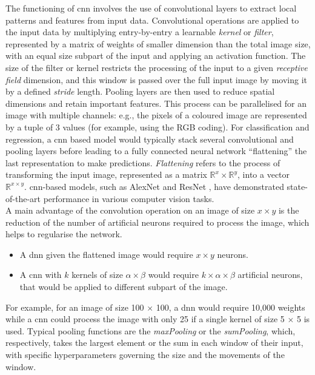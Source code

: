 The functioning of \gls{cnn} involves the use of convolutional layers to extract local patterns and features from input data. Convolutional operations are applied to the input data by multiplying entry-by-entry a learnable \textit{kernel} or \textit{filter}, represented by a matrix of weights of smaller dimension than the total image size, with an equal size subpart of the input and applying an activation function. The size of the filter or kernel restricts the processing of the input to a given \textit{receptive field} dimension, and this window is passed over the full input image by moving it by a defined \textit{stride} length. Pooling layers are then used to reduce spatial dimensions and retain important features. This process can be parallelised for an image with multiple channels: e.g., the pixels of a coloured image are represented by a tuple of 3 values (for example, using the RGB coding). For classification and regression, a \gls{cnn} based model would typically stack several convolutional and pooling layers before leading to a fully connected neural network ``flattening'' the last representation to make predictions. \textit{Flattening} refers to the process of transforming the input image, represented as a matrix $\mathbb{R}^{x} \times \mathbb{R}^{y}$, into a vector $\mathbb{R}^{x \times y}$. \gls{cnn}-based models, such as AlexNet \cite{NIPS2012_c399862d} and ResNet \cite{resNetPaper}, have demonstrated state-of-the-art performance in various computer vision tasks.\\
A main advantage of the convolution operation on an image of size $x \times y$ is the reduction of the number of artificial neurons required to process the image, which helps to regularise the network.
\begin{itemize}
    \item A \gls{dnn} given the flattened image would require $x \times y$ neurons. 
    \item A \gls{cnn} with $k$ kernels of size $\alpha \times \beta$ would require $k \times \alpha \times \beta$ artificial neurons, that would be applied to different subpart of the image. 
\end{itemize}
For example, for an image of size 100 $\times$ 100, a \gls{dnn} would require 10,000 weights while a \gls{cnn} could process the image with only 25 if a single kernel of size 5 $\times$ 5 is used. Typical pooling functions are the \textit{maxPooling} or the \textit{sumPooling}, which, respectively, takes the largest element or the sum in each window of their input, with specific hyperparameters governing the size and the movements of the window.\\
